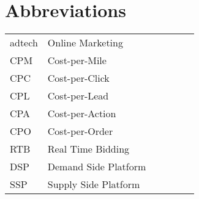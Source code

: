 \chapter*{Abbreviations}

\begin{flushleft}
\begin{tabular}{l p{0.8\linewidth}}
adtech   & Online Marketing\\
CPM   & Cost-per-Mile\\
CPC   & Cost-per-Click\\
CPL   & Cost-per-Lead\\
CPA   & Cost-per-Action\\
CPO   & Cost-per-Order\\
RTB   & Real Time Bidding\\
DSP   & Demand Side Platform\\
SSP   & Supply Side Platform\\
\end{tabular}
\end{flushleft}

